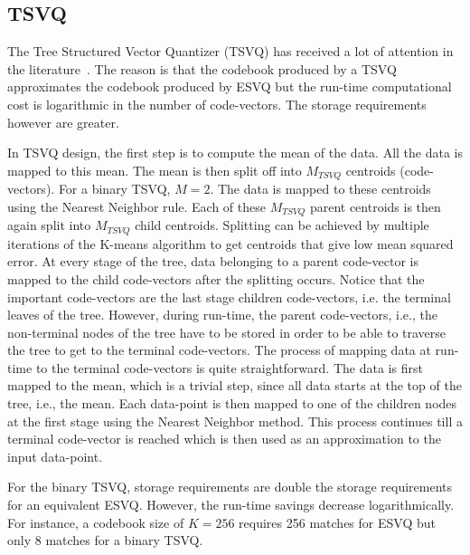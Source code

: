 \begin{Body}
\subsection{TSVQ}
The Tree Structured Vector Quantizer (TSVQ) has received a lot of attention in the literature~\cite{1991_BOOK_VQ_GershoGray}.  The reason is that the codebook produced by a TSVQ approximates the codebook produced by ESVQ but the run-time computational cost is logarithmic in the number of code-vectors.  The storage requirements however are greater.

In TSVQ design, the first step is to compute the mean of the data.  All the data is mapped to this mean.  The mean is then split off into $M_{TSVQ}$ centroids (code-vectors).  For a binary TSVQ, $M=2$.  The data is mapped to these centroids using the Nearest Neighbor rule.  Each of these $M_{TSVQ}$ parent centroids is then again split into $M_{TSVQ}$ child centroids.  Splitting can be achieved by multiple iterations of the K-means algorithm to get centroids that give low mean squared error.  At every stage of the tree, data belonging to a parent code-vector is mapped to the child code-vectors after the splitting occurs.  Notice that the important code-vectors are the last stage children code-vectors, i.e. the terminal leaves of the tree.  However, during run-time, the parent code-vectors, i.e., the non-terminal nodes of the tree have to be stored in order to be able to traverse the tree to get to the terminal code-vectors.  The process of mapping data at run-time to the terminal code-vectors is quite straightforward.  The data is first mapped to the mean, which is a trivial step, since all data starts at the top of the tree, i.e., the mean.  Each data-point is then mapped to one of the children nodes at the first stage using the Nearest Neighbor method.  This process continues till a terminal code-vector is reached which is then used as an approximation to the input data-point.

For the binary TSVQ, storage requirements are double the storage requirements for an equivalent ESVQ.  However, the run-time savings decrease logarithmically.  For instance, a codebook size of $K=256$ requires 256 matches for ESVQ but only 8 matches for a binary TSVQ.  


\end{Body}
